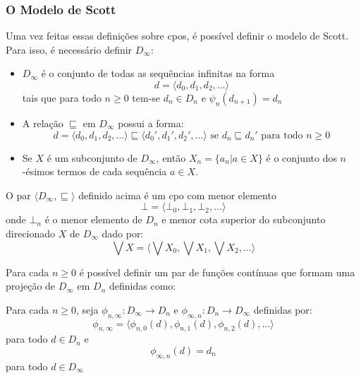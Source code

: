 \documentclass[../main.tex]{subfiles}
\begin{document}
\subsubsection{O Modelo de Scott}

Uma vez feitas essas definições sobre cpos, é possível definir o modelo de Scott. Para isso, é necessário definir $D_{\infty}$:

\begin{definition}
    \begin{itemize}
        \item $D_{\infty}$ é o conjunto de todas as sequências infinitas na forma $$d = \langle d_0, d_1, d_2, \dots \rangle$$
        tais que para todo $n \geq 0$ tem-se $d_n \in D_n$ e $\psi_n(d_{n+1}) = d_n$
        \item A relação $\sqsubseteq$ em $D_{\infty}$ possui a forma: $$d = \langle d_0, d_1, d_2, \dots \rangle \sqsubseteq \langle d_0', d_1', d_2', \dots \rangle \text{ se } d_n \sqsubseteq d_n' \text{ para todo } n \geq 0 $$
        \item Se $X$ é um subconjunto de $D_{\infty}$, então $X_n = \{ a_n | a \in X \}$ é o conjunto dos $n$-ésimos termos de cada sequência $a \in X$.
    \end{itemize}
\end{definition}

\begin{lemma}
    O par $\langle D_{\infty}, \sqsubseteq \rangle$ definido acima é um cpo com menor elemento $$\bot = \langle \bot_0, \bot_1, \bot_2, \dots \rangle$$ onde $\bot_n$ é o menor elemento de $D_n$ e menor cota superior do subconjunto direcionado $X$ de $D_{\infty}$ dado por: $$\bigvee X = \langle \bigvee X_0, \bigvee X_1, \bigvee X_2, \dots \rangle $$
\end{lemma}

Para cada $n \geq 0$ é possível definir um par de funções contínuas que formam uma projeção de $D_{\infty}$ em $D_n$ definidas como:

\begin{definition}
    Para cada $n \geq 0$, seja $\phi_{n, \infty} : D_{\infty} \to D_n$ e $\phi_{\infty, n} : D_n \to D_{\infty}$ definidas por:
    $$\phi_{n, \infty} = \langle \phi_{n,0}(d), \phi_{n,1}(d), \phi_{n,2}(d), \dots \rangle$$ para todo $d \in D_n$ e
    $$\phi_{\infty, n} (d) = d_n$$ para todo $d \in D_{\infty}$
\end{definition}
\end{document}
